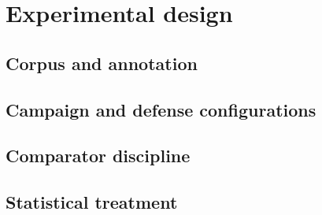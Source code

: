 \section{Experimental design}
\label{sec:design}

\subsection{Corpus and annotation}
\label{sec:design-corpus}

\subsection{Campaign and defense configurations}
\label{sec:design-campaign}

\subsection{Comparator discipline}
\label{sec:design-comparator}

\subsection{Statistical treatment}
\label{sec:design-stats}
